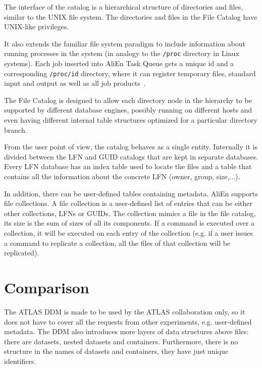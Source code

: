 The interface of the catalog is a hierarchical structure of directories and
files, similar to the UNIX file system. The directories and files in the File
Catalog have UNIX-like privileges.

It also extends the familiar file system paradigm to include information about
running processes in the system (in analogy to the \texttt{/proc} directory in Linux
systems). Each job inserted into AliEn Task Queue gets a unique id and a
corresponding \texttt{/proc/id} directory, where it can register temporary files,
standard input and output as well as all job products~\cite{AliEn1}.

The File Catalog is designed to allow each directory node in the hierarchy to
be supported by different database engines, possibly running on different hosts
and even having different internal table structures optimized for a particular
directory branch. 

From the user point of view, the catalog behaves as a single entity. Internally
it is divided between the LFN and GUID catalogs that are kept in separate
databases. Every LFN database has an index table used to locate the files and
a table that contains all the information about the concrete LFN (owner, group,
size,...).

In addition, there can be user-defined tables containing metadata.
AliEn supports file collections.  A file collection is a user-defined list of
entries that can be either other collections, LFNs or GUIDs. The collection
mimics a file in the file catalog, its size is the sum of sizes of
all its components. If a command is executed over a collection, it will be
executed on each entry of the collection (e.g. if a user issues a command to
replicate a collection, all the files of that collection will be replicated).

\section{Comparison}

The ATLAS DDM is made to be used by the ATLAS collaboration only, so it does not have to cover all the 
requests from other experiments, e.g. user-defined metadata. The DDM also introduces more layers of data 
structures above files: there are datasets, nested datasets and containers. Furthermore, 
there is no structure in the names of datasets and containers, they have just unique identifiers. 

